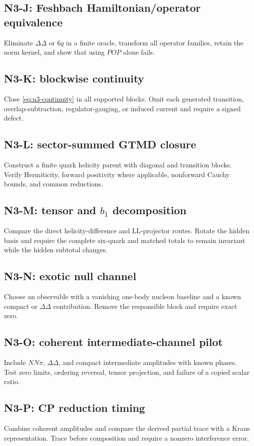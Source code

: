 \documentclass[11pt]{article}
\begin{document}
\subsection*{N3-J: Feshbach Hamiltonian/operator equivalence}
Eliminate \(\Delta\Delta\) or \(6q\) in a finite oracle, transform all operator families, retain the norm kernel, and show that using \(POP\) alone fails.

\subsection*{N3-K: blockwise continuity}
Close \cref{eq:n3-continuity} in all supported blocks.  Omit each generated transition, overlap-subtraction, regulator-gauging, or induced current and require a signed defect.

\subsection*{N3-L: sector-summed GTMD closure}
Construct a finite quark helicity parent with diagonal and transition blocks.  Verify Hermiticity, forward positivity where applicable, nonforward Cauchy bounds, and common reductions.

\subsection*{N3-M: tensor and \(b_1\) decomposition}
Compare the direct helicity-difference and LL-projector routes.  Rotate the hidden basis and require the complete six-quark and matched totals to remain invariant while the hidden subtotal changes.

\subsection*{N3-N: exotic null channel}
Choose an observable with a vanishing one-body nucleon baseline and a known compact or \(\Delta\Delta\) contribution.  Remove the responsible block and require exact zero.

\subsection*{N3-O: coherent intermediate-channel pilot}
Include \(NN\pi\), \(\Delta\Delta\), and compact intermediate amplitudes with known phases.  Test zero limits, ordering reversal, tensor projection, and failure of a copied scalar ratio.

\subsection*{N3-P: CP reduction timing}
Combine coherent amplitudes and compare the derived partial trace with a Kraus representation.  Trace before composition and require a nonzero interference error.
\end{document}
